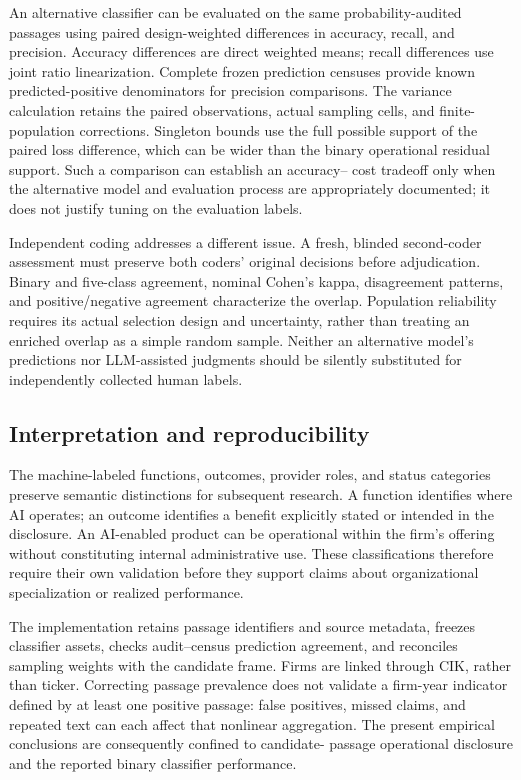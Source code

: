 \documentclass[12pt]{article}
\begin{document}
An alternative classifier can be evaluated on the same probability-audited
passages using paired design-weighted differences in accuracy, recall, and
precision. Accuracy differences are direct weighted means; recall differences
use joint ratio linearization. Complete frozen prediction censuses provide
known predicted-positive denominators for precision comparisons. The
variance calculation retains the paired observations, actual sampling cells,
and finite-population corrections. Singleton bounds use the full possible
support of the paired loss difference, which can be wider than the binary
operational residual support. Such a comparison can establish an accuracy--
cost tradeoff only when the alternative model and evaluation process are
appropriately documented; it does not justify tuning on the evaluation labels.

Independent coding addresses a different issue. A fresh, blinded second-coder
assessment must preserve both coders' original decisions before adjudication.
Binary and five-class agreement, nominal Cohen's kappa, disagreement patterns,
and positive/negative agreement characterize the overlap. Population
reliability requires its actual selection design and uncertainty, rather than
treating an enriched overlap as a simple random sample. Neither an alternative
model's predictions nor LLM-assisted judgments should be silently substituted
for independently collected human labels.

\subsection{Interpretation and reproducibility}

The machine-labeled functions, outcomes, provider roles, and status categories
preserve semantic distinctions for subsequent research. A function identifies
where AI operates; an outcome identifies a benefit explicitly stated or
intended in the disclosure. An AI-enabled product can be operational within
the firm's offering without constituting internal administrative use. These
classifications therefore require their own validation before they support
claims about organizational specialization or realized performance.

The implementation retains passage identifiers and source metadata, freezes
classifier assets, checks audit--census prediction agreement, and reconciles
sampling weights with the candidate frame. Firms are linked through CIK,
rather than ticker. Correcting passage prevalence does not validate a
firm-year indicator defined by at least one positive passage: false positives,
missed claims, and repeated text can each affect that nonlinear aggregation.
The present empirical conclusions are consequently confined to candidate-
passage operational disclosure and the reported binary classifier performance.
\end{document}
